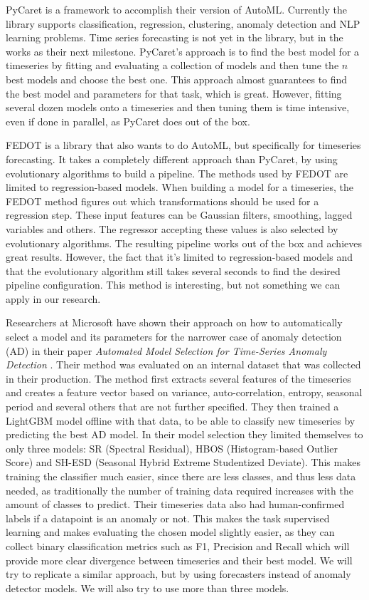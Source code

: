 PyCaret \cite{PyCaret} is a framework to accomplish their version of AutoML. Currently the library supports classification, regression, clustering, anomaly detection and NLP learning problems. Time series forecasting is not yet in the library, but in the works as their next milestone. PyCaret's approach is to find the best model for a timeseries by fitting and evaluating a collection of models and then tune the \(n\) best models and choose the best one. This approach almost guarantees to find the best model and parameters for that task, which is great. However, fitting several dozen models onto a timeseries and then tuning them is time intensive, even if done in parallel, as PyCaret does out of the box. 

FEDOT \cite{fedot} is a library that also wants to do AutoML, but specifically for timeseries forecasting. It takes a completely different approach than PyCaret, by using evolutionary algorithms to build a pipeline. The methods used by FEDOT are limited to regression-based models. When building a model for a timeseries, the FEDOT method figures out which transformations should be used for a regression step. These input features can be Gaussian filters, smoothing, lagged variables and others. The regressor accepting these values is also selected by evolutionary algorithms. The resulting pipeline works out of the box and achieves great results. However, the fact that it's limited to regression-based models and that the evolutionary algorithm still takes several seconds to find the desired pipeline configuration. This method is interesting, but not something we can apply in our research.

Researchers at Microsoft have shown their approach on how to automatically select a model and its parameters for the narrower case of anomaly detection (AD) in their paper \emph{Automated Model Selection for Time-Series Anomaly Detection} \cite{ms-ad-model-selection}. Their method was evaluated on an internal dataset that was collected in their production. The method first extracts several features of the timeseries and creates a feature vector based on variance, auto-correlation, entropy, seasonal period and several others that are not further specified. They then trained a LightGBM model offline with that data, to be able to classify new timeseries by predicting the best AD model. In their model selection they limited themselves to only three models: SR (Spectral Residual), HBOS (Histogram-based Outlier Score) and SH-ESD (Seasonal Hybrid Extreme Studentized Deviate). This makes training the classifier much easier, since there are less classes, and thus less data needed, as traditionally the number of training data required increases with the amount of classes to predict. Their timeseries data also had human-confirmed labels if a datapoint is an anomaly or not. This makes the task supervised learning and makes evaluating the chosen model slightly easier, as they can collect binary classification metrics such as F1, Precision and Recall which will provide more clear divergence between timeseries and their best model. We will try to replicate a similar approach, but by using forecasters instead of anomaly detector models. We will also try to use more than three models.



